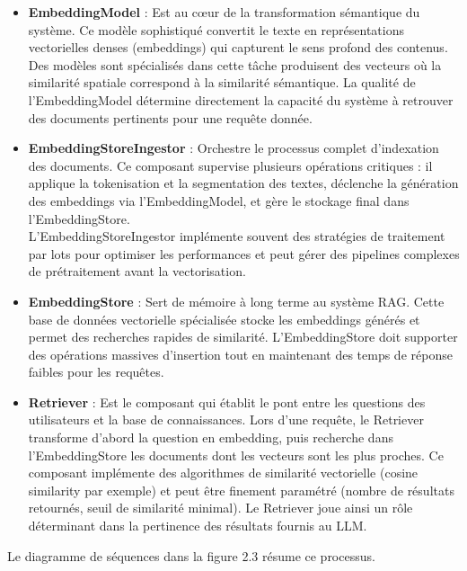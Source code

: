 \documentclass[12pt,a4paper]{report}
\begin{document}
\begin{itemize}
		\item \textbf{EmbeddingModel} : Est au cœur de la transformation sémantique du système. Ce modèle sophistiqué convertit le texte en représentations vectorielles denses (embeddings) qui capturent le sens profond des contenus. Des modèles sont spécialisés dans cette tâche produisent des vecteurs où la similarité spatiale correspond à la similarité sémantique. La qualité de l'EmbeddingModel détermine directement la capacité du système à retrouver des documents pertinents pour une requête donnée.
		
		\item \textbf{EmbeddingStoreIngestor} : Orchestre le processus complet d'indexation des documents. Ce composant supervise plusieurs opérations critiques : il applique la tokenisation et la segmentation des textes, déclenche la génération des embeddings via l'EmbeddingModel, et gère le stockage final dans l'EmbeddingStore. \\ L'EmbeddingStoreIngestor implémente souvent des stratégies de traitement par lots pour optimiser les performances et peut gérer des pipelines complexes de prétraitement avant la vectorisation.
		
		\item \textbf{EmbeddingStore} : Sert de mémoire à long terme au système RAG. Cette base de données vectorielle spécialisée stocke les embeddings générés et permet des recherches rapides de similarité. L'EmbeddingStore doit supporter des opérations massives d'insertion tout en maintenant des temps de réponse faibles pour les requêtes.
		
		\item \textbf{Retriever} : Est le composant qui établit le pont entre les questions des utilisateurs et la base de connaissances. Lors d'une requête, le Retriever transforme d'abord la question en embedding, puis recherche dans l'EmbeddingStore les documents dont les vecteurs sont les plus proches. Ce composant implémente des algorithmes de similarité vectorielle (cosine similarity par exemple) et peut être finement paramétré (nombre de résultats retournés, seuil de similarité minimal). Le Retriever joue ainsi un rôle déterminant dans la pertinence des résultats fournis au LLM.
		
	\end{itemize}
	
	Le diagramme de séquences dans la figure 2.3 résume ce processus.
	
\end{document}
